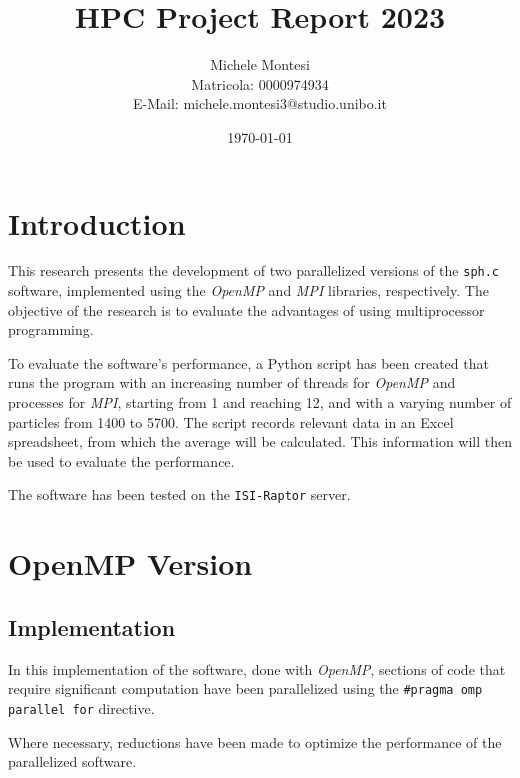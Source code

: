 \documentclass[a4paper, 12pt]{report}
\title{HPC Project Report 2023}
\author{Michele Montesi \\
        Matricola: 0000974934 \\
        E-Mail: michele.montesi3@studio.unibo.it}
\date{\today}
\begin{document}
\maketitle

\chapter*{Introduction}
\begin{sloppypar}
This research presents the development of two parallelized versions of the \texttt{sph.c} software, 
implemented using the \textit{OpenMP} and \textit{MPI} libraries, respectively. The objective of the research 
is to evaluate the advantages of using multiprocessor programming.
\end{sloppypar}

\bigskip

\begin{sloppypar}
\noindent
To evaluate the software's performance, a Python script has been created that runs the program with an increasing number of threads for \textit{OpenMP} and processes for \textit{MPI}, starting from 1 and reaching 12, and with a varying number of particles from 1400 to 5700. The script records relevant data in an Excel spreadsheet, from which the average will be calculated. This information will then be used to evaluate the performance.

\bigskip
\noindent
The software has been tested on the \texttt{ISI-Raptor} server.

\end{sloppypar}

{\let\clearpage\relax\chapter*{OpenMP Version}}
\section*{Implementation}
\begin{sloppypar}
  \noindent
  In this implementation of the software, done with \textit{OpenMP}, sections of code that require significant computation have been parallelized using the \texttt{\#pragma omp parallel for} directive.

  \smallskip
  \noindent
  Where necessary, reductions have been made to optimize the performance of the parallelized software.
\end{sloppypar}
\end{document}

